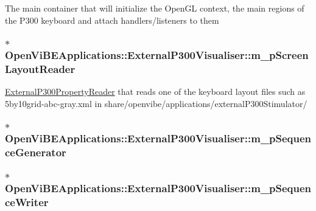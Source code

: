 \label{classOpenViBEApplications_1_1ExternalP300Visualiser_a41e13bb1e9208989a27b9d99d620eb01}
The main container that will initialize the OpenGL context, the main regions of the P300 keyboard and attach handlers/listeners to them \hypertarget{classOpenViBEApplications_1_1ExternalP300Visualiser_aad1840ac9784503247ad735b295f8027}{
\subsubsection[{m\_\-pScreenLayoutReader}]{$\ast$ {\bf OpenViBEApplications::ExternalP300Visualiser::m\_\-pScreenLayoutReader}}}
\label{classOpenViBEApplications_1_1ExternalP300Visualiser_aad1840ac9784503247ad735b295f8027}
\hyperlink{classOpenViBEApplications_1_1ExternalP300PropertyReader}{ExternalP300PropertyReader} that reads one of the keyboard layout files such as 5by10grid-\/abc-\/gray.xml in share/openvibe/applications/externalP300Stimulator/ \hypertarget{classOpenViBEApplications_1_1ExternalP300Visualiser_a3891dbe652e540d5739b689c9a82f1e1}{
\subsubsection[{m\_\-pSequenceGenerator}]{$\ast$ {\bf OpenViBEApplications::ExternalP300Visualiser::m\_\-pSequenceGenerator}}}
\label{classOpenViBEApplications_1_1ExternalP300Visualiser_a3891dbe652e540d5739b689c9a82f1e1}
\hypertarget{classOpenViBEApplications_1_1ExternalP300Visualiser_a4f56254ed488ec70b79c61116c2b4739}{
\subsubsection[{m\_\-pSequenceWriter}]{$\ast$ {\bf OpenViBEApplications::ExternalP300Visualiser::m\_\-pSequenceWriter}}}
